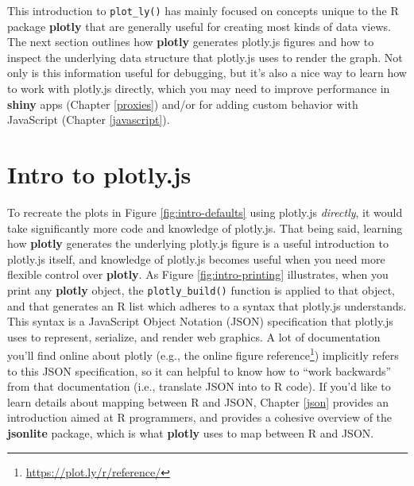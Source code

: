 \documentclass[
  12pt,
]{krantz}
\renewcommand{\href}[2]{#2\footnote{\url{#1}}}
\begin{document}
This introduction to \texttt{plot\_ly()} has mainly focused on concepts unique to the R package \textbf{plotly} that are generally useful for creating most kinds of data views. The next section outlines how \textbf{plotly} generates plotly.js figures and how to inspect the underlying data structure that plotly.js uses to render the graph. Not only is this information useful for debugging, but it's also a nice way to learn how to work with plotly.js directly, which you may need to improve performance in \textbf{shiny} apps (Chapter \ref{proxies}) and/or for adding custom behavior with JavaScript (Chapter \ref{javascript}).

\hypertarget{intro-plotly-js}{%
\section{Intro to plotly.js}\label{intro-plotly-js}}

To recreate the plots in Figure \ref{fig:intro-defaults} using plotly.js \emph{directly}, it would take significantly more code and knowledge of plotly.js. That being said, learning how \textbf{plotly} generates the underlying plotly.js figure is a useful introduction to plotly.js itself, and knowledge of plotly.js becomes useful when you need more flexible control over \textbf{plotly}. As Figure \ref{fig:intro-printing} illustrates, when you print any \textbf{plotly} object, the \texttt{plotly\_build()} function is applied to that object, and that generates an R list which adheres to a syntax that plotly.js understands. This syntax is a JavaScript Object Notation (JSON) specification that plotly.js uses to represent, serialize, and render web graphics. A lot of documentation you'll find online about plotly (e.g., the online \href{https://plot.ly/r/reference/}{figure reference}) implicitly refers to this JSON specification, so it can helpful to know how to ``work backwards'' from that documentation (i.e., translate JSON into to R code). If you'd like to learn details about mapping between R and JSON, Chapter \ref{json} provides an introduction aimed at R programmers, and \citet{jsonlite} provides a cohesive overview of the \textbf{jsonlite} package, which is what \textbf{plotly} uses to map between R and JSON.
\end{document}
